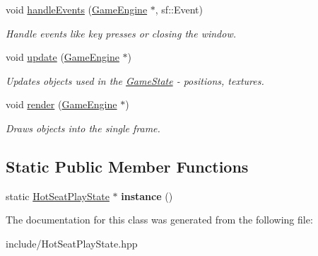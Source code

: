 \begin{DoxyCompactItemize}
void \mbox{\hyperlink{class_hot_seat_play_state_a92606c5f4b8106b4fec1482a75be3c8d}{handle\+Events}} (\mbox{\hyperlink{class_game_engine}{Game\+Engine}} $\ast$, sf\+::\+Event)
\begin{DoxyCompactList}\small\item\em Handle events like key presses or closing the window. \end{DoxyCompactList}\item 
\mbox{\label{class_hot_seat_play_state_a63baf261e84e10203286fc82082cccdd}} 
void \mbox{\hyperlink{class_hot_seat_play_state_a63baf261e84e10203286fc82082cccdd}{update}} (\mbox{\hyperlink{class_game_engine}{Game\+Engine}} $\ast$)
\begin{DoxyCompactList}\small\item\em Updates objects used in the \mbox{\hyperlink{class_game_state}{Game\+State}} -\/ positions, textures. \end{DoxyCompactList}\item 
\mbox{\label{class_hot_seat_play_state_a66bbc19d0a2046a3ff2d926669d0ae26}} 
void \mbox{\hyperlink{class_hot_seat_play_state_a66bbc19d0a2046a3ff2d926669d0ae26}{render}} (\mbox{\hyperlink{class_game_engine}{Game\+Engine}} $\ast$)
\begin{DoxyCompactList}\small\item\em Draws objects into the single frame. \end{DoxyCompactList}\end{DoxyCompactItemize}
\subsection*{Static Public Member Functions}
\begin{DoxyCompactItemize}
\item 
\mbox{\label{class_hot_seat_play_state_a2a0510cffde2533a6b8c9e02fa299302}} 
static \mbox{\hyperlink{class_hot_seat_play_state}{Hot\+Seat\+Play\+State}} $\ast$ {\bfseries instance} ()
\end{DoxyCompactItemize}


The documentation for this class was generated from the following file\+:\begin{DoxyCompactItemize}
\item 
include/Hot\+Seat\+Play\+State.\+hpp\end{DoxyCompactItemize}
